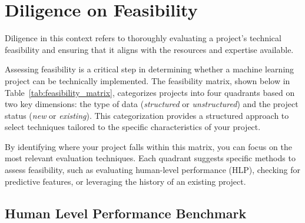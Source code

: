 \documentclass[12pt,openany]{book}
\begin{document}
\section{Diligence on Feasibility}

Diligence in this context refers to thoroughly evaluating a project's technical feasibility and ensuring that it aligns with the resources and expertise available.

Assessing feasibility is a critical step in determining whether a machine learning project can be technically implemented. The feasibility matrix, shown below in Table~\ref{tab:feasibility_matrix}, categorizes projects into four quadrants based on two key dimensions: the type of data (\textit{structured} or \textit{unstructured}) and the project status (\textit{new} or \textit{existing}). This categorization provides a structured approach to select techniques tailored to the specific characteristics of your project.


\begin{table}[htbp]
\centering
\caption{The feasibility matrix categorizes projects based on data type (structured or unstructured) and project status (new or existing) to guide the selection of techniques for assessing feasibility.}
\label{tab:feasibility_matrix}
\end{table}

By identifying where your project falls within this matrix, you can focus on the most relevant evaluation techniques. Each quadrant suggests specific methods to assess feasibility, such as evaluating human-level performance (HLP), checking for predictive features, or leveraging the history of an existing project. 


\subsection{Human Level Performance Benchmark}
\end{document}

